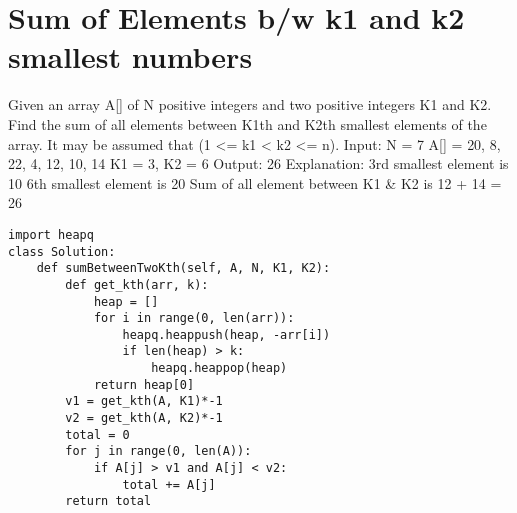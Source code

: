 \documentclass[24pt, a4]{article}
\begin{document}
\section{Sum of Elements b/w k1 and k2 smallest numbers}
Given an array A[] of N positive integers and two positive integers K1 and K2.
Find the sum of all elements between K1th and K2th smallest elements of the 
array. It may be assumed that (1 <= k1 < k2 <= n).
Input: N  = 7 A[] = {20, 8, 22, 4, 12, 10, 14} K1 = 3, K2 = 6 Output: 26
Explanation: 3rd smallest element is 10 6th smallest element is 20
Sum of all element between
K1 \& K2 is 12 + 14 = 26
\begin{lstlisting}
import heapq
class Solution:
    def sumBetweenTwoKth(self, A, N, K1, K2):
        def get_kth(arr, k):
            heap = []
            for i in range(0, len(arr)):
                heapq.heappush(heap, -arr[i])
                if len(heap) > k:
                    heapq.heappop(heap)
            return heap[0]
        v1 = get_kth(A, K1)*-1
        v2 = get_kth(A, K2)*-1
        total = 0
        for j in range(0, len(A)):
            if A[j] > v1 and A[j] < v2:
                total += A[j]
        return total
\end{lstlisting}
\end{document}
